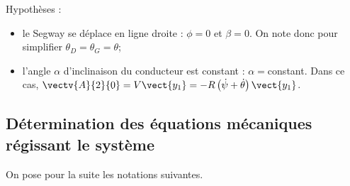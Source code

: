 Hypothèses :
\begin{itemize}
\item le Segway  se déplace en ligne droite : $\phi=0$ et $\beta=0$. On note donc pour simplifier $\theta_D=\theta_G = \theta$;
\item l’angle $\alpha$ d’inclinaison du conducteur est constant : $\alpha=$constant. Dans ce cas, $\vectv{A}{2}{0}=V\vect{y_1}=-R\left(\dot{\psi}+\dot{\theta}\right) \vect{y_1}$.
\end{itemize}

\fi

\subsection{Détermination des équations mécaniques régissant le système}

\ifprof
\else

On pose pour la suite les notations suivantes.

